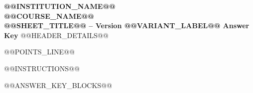 \documentclass[11pt,a4paper]{article}
\begin{document}
\begin{center}
{\Large \textbf{@@INSTITUTION_NAME@@}}\\
{\large \textbf{@@COURSE_NAME@@}}\\
{\large \textbf{@@SHEET_TITLE@@ -- Version @@VARIANT_LABEL@@ Answer Key}}
@@HEADER_DETAILS@@
\end{center}

@@POINTS_LINE@@

@@INSTRUCTIONS@@

@@ANSWER_KEY_BLOCKS@@
\end{document}

